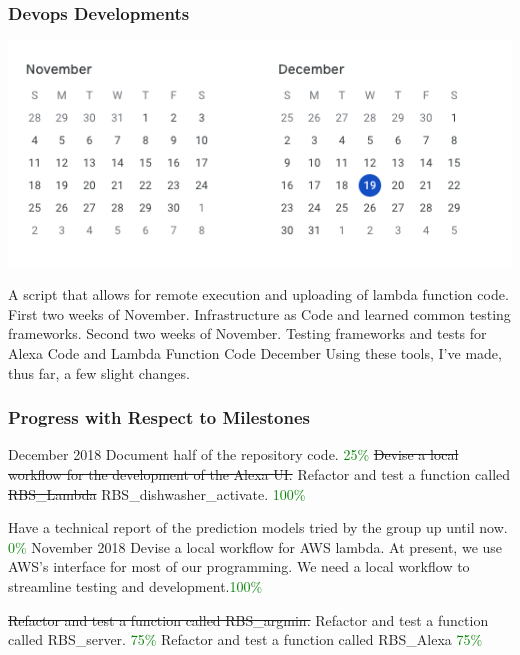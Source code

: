 \documentclass{beamer}
\begin{document}
\begin{frame}
    \frametitle{Devops Developments}
    \includegraphics[width=0.5\paperwidth,height=0.5\paperheight,keepaspectratio]{pictures/nov_dec}
    \begin{outline}
         A script that allows for remote execution and uploading of lambda function code.
         First two weeks of November.
         Infrastructure as Code and learned common testing frameworks.
         Second two weeks of November.
         Testing frameworks and tests for Alexa Code and Lambda Function Code
         December
         Using these tools, I've made, thus far, a few slight changes.
    \end{outline}
\end{frame}

\begin{frame}
    \frametitle{Progress with Respect to Milestones}
    \begin{outline}
    \1 December 2018
    \2 Document half of the repository code. \textcolor{green}{25\%}
\2 \st{Devise a local workflow for the development of the Alexa UI.}
    \2 Refactor and test a function called \st{RBS\_Lambda} RBS\_dishwasher\_activate. \textcolor{green}{100\%}

    \2 Have a technical report of the prediction models tried by the group up until now. \textcolor{green}{0\%}
    \1 November 2018
    \2 Devise a local workflow for AWS lambda. At present, we use AWS's interface for most of our programming. We need a local workflow to
    streamline testing and development.\textcolor{green}{100\%}

\2 \st{Refactor and test a function called RBS\_argmin.}
    \2 Refactor and test a function called RBS\_server. \textcolor{green}{75\%}
    \2 Refactor and test a function called RBS\_Alexa \textcolor{green}{75\%}

    \end{outline}
\end{frame}
\end{document}
